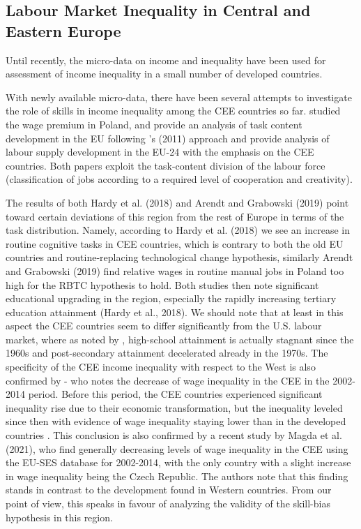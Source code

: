 \documentclass[11pt]{article}
\begin{document}
\subsection{Labour Market Inequality in Central and Eastern Europe}
Until recently, the micro-data on income and inequality have been used for assessment of income inequality in a small number of developed countries.

With newly available micro-data, there have been several attempts to investigate the role of skills in income inequality among the CEE countries so far. \citet{arendt2019technical} studied the wage premium in Poland, and \citet{hardy2018educational} provide an analysis of task content development in the EU following \citeauthor{acemoglu2011skills}'s (2011) approach and provide analysis of labour supply development in the EU-24 with the emphasis on the CEE countries. Both papers exploit the task-content division of the labour force (classification of jobs according to a required level of cooperation and creativity).

The results of both Hardy et al. (2018) and Arendt and Grabowski (2019) point toward certain deviations of this region from the rest of Europe in terms of the task distribution. Namely, according to Hardy et al. (2018) we see an increase in routine cognitive tasks in CEE countries, which is contrary to both the old EU countries and routine-replacing technological change hypothesis, similarly Arendt and Grabowski (2019) find relative wages in routine manual jobs in Poland too high for the RBTC hypothesis to hold. Both studies then note significant educational upgrading in the region, especially the rapidly increasing tertiary education attainment (Hardy et al., 2018). We should note that at least in this aspect the CEE countries seem to differ significantly from the U.S. labour market, where as noted by \citet{acemoglu2012does}, high-school attainment is actually stagnant since the 1960s and post-secondary attainment decelerated already in the 1970s. The specificity of the CEE income inequality with respect to the West is also confirmed by \citet{magda2021firms} - who notes the decrease of wage inequality in the CEE in the 2002-2014 period. Before this period, the CEE countries experienced significant inequality rise due to their economic transformation, but the inequality leveled since then \citep{tyrowicz2019wage} with evidence of wage inequality staying lower than in the developed countries \citep{mysikova2018personal}. This conclusion is also confirmed by a recent study by Magda et al. (2021), who find generally decreasing levels of wage inequality in the CEE using the EU-SES database for 2002-2014, with the only country with a slight increase in wage inequality being the Czech Republic. The authors note that this finding stands in contrast to the development found in Western countries. From our point of view, this speaks in favour of analyzing the validity of the skill-bias hypothesis in this region.
\end{document}
